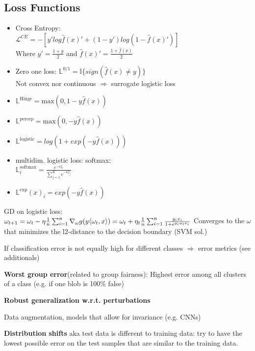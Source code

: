 \subsection{Loss Functions}

\begin{itemize}
    \item Cross Entropy: \\$\mathcal{L}^{CE} = -\left[y'log\hat{f}(x)' + (1-y')log(1-\hat{f}(x)')\right]$\\
    Where $y' = \frac{1+y}{2}$ and $\hat{f}(x)' = \frac{1+\hat{f}(x)}{2}$
    \item Zero one loss: $\mathbb{L}^{0/1} = \mathbb{I}\{sign(\hat{f}(x) \neq y)\}$\\
    Not convex nor continuous $\Rightarrow$ surrogate logistic loss 
    \item $\mathbb{L}^{\text{Hinge}
    } = \text{max}(0,1-y\hat{f}(x))$
    \item $\mathbb{L}^{\text{percep}} = \text{max}(0, - y\hat{f}(x))$
    \item $\mathbb{L}^{\text{logistic}} = log(1 + exp(-y\hat{f}(x)))$
    \item multidim. logistic loss: softmax: \\
    $\mathbb{L}^{\text{softmax}}_i = \frac{e^{-af_i}}{\sum_{j=1}^{K}e^{-af_j}}$
    \item $\mathbb{L}^{\text{exp}}(x)_i = exp(-y\hat{f}(x))$
\end{itemize}

GD on logistic loss:\\
$\omega_{t+1} = \omega_t - \eta \frac{1}{n}\sum_{i=1}^n\nabla_\omega g(y\langle\omega_t,x\rangle) = \\\omega_t + \eta_t \frac{1}{n}\sum_{i=1}^n\frac{y_ix_i}{1+e^{y_i\omega_tx_i}}$ Converges to the $\omega$ that minimizes the l2-distance to the decision boundary (SVM sol.)

If classification error is not equally high for different classes $\Rightarrow$ error metrics (see additionals)

\textbf{Worst group error}(related to group fairness): Highest error among all clusters of a class (e.g. if one blob is 100\% false)

\textbf{Robust generalization w.r.t. perturbations}

Data augmentation, models that allow for invariance (e.g. CNNs)

\textbf{Distribution shifts} aka test data is different to training data: try to have the lowest possible error on the test samples that are similar to the training data.



